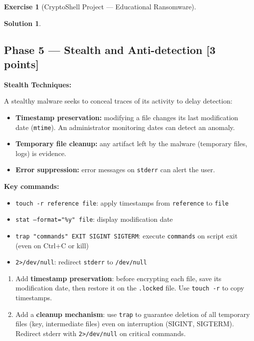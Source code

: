 \documentclass[a4paper,11pt]{article}
\theoremstyle{plain}
\newtheorem{correction}{Solution}
\theoremstyle{definition}
\newtheorem{exercice}{Exercise}
\begin{document}
\begin{exercice}[CryptoShell Project --- Educational Ransomware]
\begin{correction}
\end{correction}



\subsection*{Phase 5 --- Stealth and Anti-detection \hfill \normalsize [3 points]}

\begin{rappel}
\textbf{Stealth Techniques:}

A stealthy malware seeks to conceal traces of its activity to delay detection:
\begin{itemize}
    \item \textbf{Timestamp preservation:} modifying a file changes its last modification date (\texttt{mtime}). An administrator monitoring dates can detect an anomaly.
    \item \textbf{Temporary file cleanup:} any artifact left by the malware (temporary files, logs) is evidence.
    \item \textbf{Error suppression:} error messages on \texttt{stderr} can alert the user.
\end{itemize}

\medskip
\textbf{Key commands:}
\begin{itemize}
    \item \texttt{touch -r reference file}: apply timestamps from \texttt{reference} to \texttt{file}
    \item \texttt{stat --format="\%y" file}: display modification date
    \item \texttt{trap "commands" EXIT SIGINT SIGTERM}: execute \texttt{commands} on script exit (even on Ctrl+C or kill)
    \item \texttt{2>/dev/null}: redirect \texttt{stderr} to \texttt{/dev/null}
\end{itemize}
\end{rappel}

\begin{enumerate}
\item[\textbf{5a)}] Add \textbf{timestamp preservation}: before encrypting each file, save its modification date, then restore it on the \texttt{.locked} file. Use \texttt{touch -r} to copy timestamps.

\item[\textbf{5b)}] Add a \textbf{cleanup mechanism}: use \texttt{trap} to guarantee deletion of all temporary files (key, intermediate files) even on interruption (SIGINT, SIGTERM). Redirect stderr with \texttt{2>/dev/null} on critical commands.


\end{enumerate}
\end{exercice}
\end{document}
